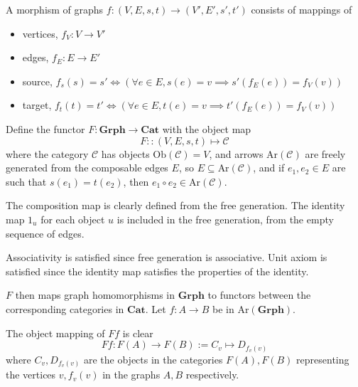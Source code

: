 \documentclass[11pt]{article} %
\theoremstyle{definition}
\theoremstyle{definition}
\theoremstyle{definition}
\begin{document}
A morphism of graphs $f: (V,E,s,t) \rightarrow (V', E', s',t')$ consists of mappings of
\begin{itemize}
  \item vertices, $f_V : V \rightarrow V'$
  \item edges, $f_E : E \rightarrow E'$
  \item source, $f_s(s) = s' \iff (\forall e\in E, s(e) = v \implies s'(f_E(e)) = f_V(v))$
  \item target, $f_t(t) = t' \iff (\forall e\in E, t(e) = v \implies t'(f_E(e)) = f_V(v))$
\end{itemize}

Define the functor $F: \textbf{Grph} \rightarrow \textbf{Cat}$ with the object map
\[F :: (V,E,s,t) \mapsto \mathcal{C}\]
where the category $\mathcal{C}$ has objects $\text{Ob}(\mathcal{C}) = V$,
and arrows $\text{Ar}(\mathcal{C})$ are freely generated from the composable edges $E$,
so $E \subseteq\text{Ar}(\mathcal{C})$, and if $e_1,e_2\in E$ are such that $s(e_1)=t(e_2)$, 
then $e_1\circ e_2 \in\text{Ar}(\mathcal{C})$.

The composition map is clearly defined from the free generation. 
The identity map $1_u$ for each object $u$ is included in the free generation,
from the empty sequence of edges.

Associativity is satisfied since free generation is associative.
Unit axiom is satisfied since the identity map satisfies the properties of the identity.

$F$ then maps graph homomorphisms in $\mathbf{Grph}$ 
to functors between the corresponding categories in $\mathbf{Cat}$.
Let $f:A\rightarrow B$ be in $\text{Ar}(\mathbf{Grph})$.

The object mapping of $Ff$ is clear
\[Ff : F(A) \rightarrow F(B) := C_v \mapsto D_{f_v(v)}\]
where $C_v, D_{f_v(v)}$ are the objects in the categories $F(A),F(B)$ 
representing the vertices $v, f_v(v)$ in the graphs $A,B$ respectively.
\end{document}
